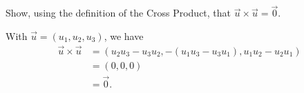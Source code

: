 
\begin{Exercise}[
name={},
title={}, 
difficulty=0,
origin={\cite{GHC}}]
Show, using the definition of the Cross Product, that $\vec u\times\vec u=\vec 0$.

\end{Exercise}

\begin{Answer}
With $\vec u = (u_1,u_2,u_3)$, we have
\begin{align*}
\vec u\times\vec u &= (u_2u_3-u_3u_2,-(u_1u_3-u_3u_1),u_1u_2-u_2u_1) \\
		&= (0,0,0)\\
		&=\vec 0.
\end{align*}

\end{Answer}
